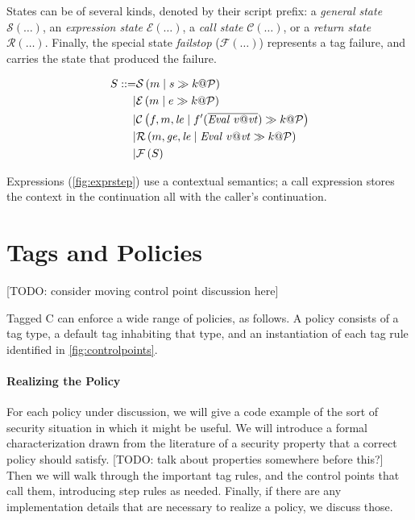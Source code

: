 \documentclass[acmsmall,review,anonymous]{acmart}\settopmatter{printfolios=true,printccs=false,printacmref=false}
\begin{document}
States can be of several kinds, denoted by their script prefix: a {\em general state} \(\mathcal{S}(\dots)\),
an {\em expression state} \(\mathcal{E}(\dots)\), a {\em call state} \(\mathcal{C}(\dots)\), or a
{\em return state} \(\mathcal{R}(\dots)\). Finally, the special state {\em failstop} (\(\mathcal{F}(\dots)\))
represents a tag failure, and carries the state that produced the failure.

\[\begin{aligned}
S ::= & \mathcal{S}\left(m \mid s \gg k @ \mathcal{P}\right) \\
| & \mathcal{E}\left(m \mid e \gg k @ \mathcal{P}\right) \\
| & \mathcal{C}\left(f,m,\mathit{le} \mid f'(\overline{\mathit{Eval} ~ v@\mathit{vt}}) \gg k @ \mathcal{P}\right) \\
| & \mathcal{R}\left(m,\mathit{ge},\mathit{le} \mid \mathit{Eval} ~ v@\mathit{vt} \gg k @ \mathcal{P}\right) \\
| & \mathcal{F}\left(S\right) \\
\end{aligned}\]

Expressions (\cref{fig:exprstep}) use a contextual semantics; a call expression stores the
context in the continuation all with the caller's continuation.

\section{Tags and Policies}

[TODO: consider moving control point discussion here]

Tagged C can enforce a wide range of policies, as follows.
A policy consists of a tag type, a default tag inhabiting that type, and an instantiation
of each tag rule identified in \cref{fig:controlpoints}.

\paragraph*{Realizing the Policy}

For each policy under discussion, we will give a code example of the sort of security
situation in which it might be useful. We will introduce a formal characterization drawn
from the literature of a security property that a correct policy should satisfy.
[TODO: talk about properties somewhere before this?]
Then we will walk through the important tag rules, and the control points that call them,
introducing step rules as needed. Finally, if there are any implementation details that
are necessary to realize a policy, we discuss those.
\end{document}
